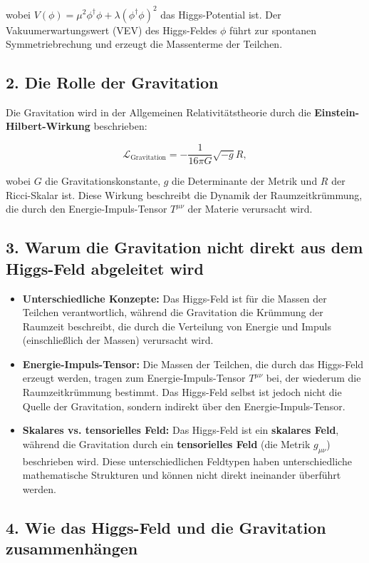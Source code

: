 \documentclass{article}
\begin{document}
wobei $V(\phi) = \mu^2 \phi^\dagger \phi + \lambda (\phi^\dagger \phi)^2$ das Higgs-Potential ist. Der Vakuumerwartungswert (VEV) des Higgs-Feldes $\phi$ führt zur spontanen Symmetriebrechung und erzeugt die Massenterme der Teilchen.

\subsection{2. Die Rolle der Gravitation}

Die Gravitation wird in der Allgemeinen Relativitätstheorie durch die \textbf{Einstein-Hilbert-Wirkung} beschrieben:

\[
\mathcal{L}_\text{Gravitation} = -\frac{1}{16\pi G} \sqrt{-g} R,
\]

wobei $G$ die Gravitationskonstante, $g$ die Determinante der Metrik und $R$ der Ricci-Skalar ist. Diese Wirkung beschreibt die Dynamik der Raumzeitkrümmung, die durch den Energie-Impuls-Tensor $T^{\mu\nu}$ der Materie verursacht wird.

\subsection{3. Warum die Gravitation nicht direkt aus dem Higgs-Feld abgeleitet wird}

\begin{itemize}
	\item \textbf{Unterschiedliche Konzepte:} Das Higgs-Feld ist für die Massen der Teilchen verantwortlich, während die Gravitation die Krümmung der Raumzeit beschreibt, die durch die Verteilung von Energie und Impuls (einschließlich der Massen) verursacht wird.
	\item \textbf{Energie-Impuls-Tensor:} Die Massen der Teilchen, die durch das Higgs-Feld erzeugt werden, tragen zum Energie-Impuls-Tensor $T^{\mu\nu}$ bei, der wiederum die Raumzeitkrümmung bestimmt. Das Higgs-Feld selbst ist jedoch nicht die Quelle der Gravitation, sondern indirekt über den Energie-Impuls-Tensor.
	\item \textbf{Skalares vs. tensorielles Feld:} Das Higgs-Feld ist ein \textbf{skalares Feld}, während die Gravitation durch ein \textbf{tensorielles Feld} (die Metrik $g_{\mu\nu}$) beschrieben wird. Diese unterschiedlichen Feldtypen haben unterschiedliche mathematische Strukturen und können nicht direkt ineinander überführt werden.
\end{itemize}

\subsection{4. Wie das Higgs-Feld und die Gravitation zusammenhängen}
\end{document}
